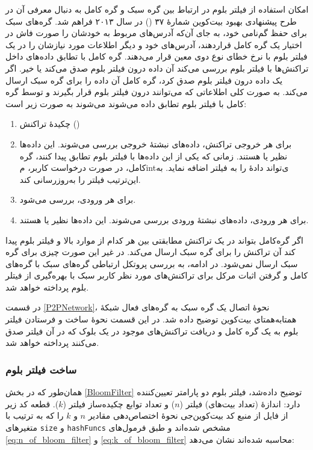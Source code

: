 امکان استفاده از فیلتر بلوم در ارتباط بین گره سبک و گره کامل به دنبال معرفی آن در طرح پیشنهادی بهبود بیت‌کوین شمارهٔ ۳۷ () \cite{Hearn2013} در سال ۲۰۱۳ فراهم شد.  گره‌‌های سبک برای حفظ گم‌نامی خود، به جای آن‌که آدرس‌های مربوط به خودشان را صورت فاش در اختیار یک گره کامل قراردهند، آدرس‌های خود و دیگر اطلاعات مورد نیازشان را در یک فیلتر بلوم با نرخ خطای نوع دوی معین قرار می‌دهند. گره کامل با تطابق داده‌های داخل تراکنش‌ها با فیلتر بلوم بررسی می‌کند آن داده درون فیلتر بلوم صدق می‌کند یا خیر. اگر یک داده درون فیلتر بلوم صدق کرد، گره کامل آن داده را برای گره سبک ارسال می‌کند. به صورت کلی اطلاعاتی که می‌توانند درون فیلتر بلوم قرار بگیرند و توسط گره کامل با فیلتر بلوم تطابق داده می‌شوند می‌شوند به صورت زیر است:
\begin{enumerate}
\item{%
چکیدهٔ تراکنش‌ ()}
\item{%
برای هر خروجی تراکنش، داده‌های
نبشتهٔ خروجی بررسی می‌شوند. این داده‌ها نظیر  یا  هستند. زمانی که یکی از این داده‌ها با فیلتر بلوم تطابق پیدا کنند، گره کامل، در صورت درخواست کاربر، مintی‌تواند دادهٔ  را به فیلتر اضافه نماید. به این‌ترتیب فیلتر را به‌روزرسانی کند.
}
\item{%
برای هر ورودی،  بررسی می‌شود.
}
\item{%
برای هر ورودی، داده‌های نبشتهٔ ورودی بررسی می‌شوند. این داده‌ها نظیر 
یا
هستند.
}
\end{enumerate} 

اگر گره‌کامل بتواند در یک تراکنش مطابقتی بین هر کدام از موارد بالا و فیلتر بلوم پیدا کند آن تراکنش را برای گره سبک ارسال می‌کند. در غیر این صورت چیزی برای گره سبک ارسال نمی‌شود. در ادامه، به بررسی پروتکل ارتباطی گره‌های سبک با گره‌های کامل و گرفتن اثبات مرکل  برای تراکنش‌های مورد نظر کاربر سبک با بهره‌گیری از فیتلر بلوم پرداخته خواهد شد. 

در قسمت \ref{P2PNetwork}، نحوهٔ اتصال یک گره سبک به گره‌های فعال شبکه‌ٔ همتا‌به‌همتای بیت‌کوین توضیح داده شد. در این قسمت نحوهٔ ساخت و فرستادن فیلتر بلوم به یک گره کامل و دریافت تراکنش‌های موجود در یک بلوک که در آن فیلتر صدق می‌کنند پرداخته خواهد شد.

\subsubsection{ساخت فیلتر بلوم}
همان‌طور که در بخش \ref{BloomFilter} توضیح داده‌شد، فیلتر بلوم دو پارامتر تعیین‌کننده دارد: اندازهٔ (تعداد بیت‌های) فیلتر ($n$) و تعداد توابع چکیده‌ساز فیلتر ($k$). قطعه کد زیر از فایل  از منبع کد بیت‌کوین‌جی \cite{bitcoinj_BloomFilter} نحوه‌ٔ اختصاص‌دهی مقادیر $n$ و $k$ را که به ترتیب با متغیر‌های \texttt{size} و \texttt{hashFuncs} مشخص شده‌اند و طبق فرمول‌های \eqref{eq:n_of_bloom_filter} و \eqref{eq:k_of_bloom_filter} محاسبه شده‌اند نشان می‌دهد:

